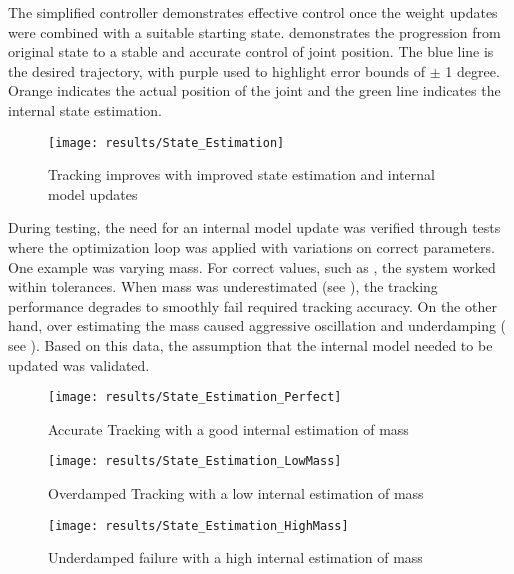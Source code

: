 

The simplified controller demonstrates effective control once the weight updates
were combined with a suitable starting state. 
demonstrates the progression from original state to a stable and accurate
control of joint position. The blue line is the desired trajectory, with purple
used to highlight error bounds of $\pm$ 1 degree. Orange indicates the actual
position of the joint and the green line indicates the internal state
estimation.

\begin{figure}
\centering
\texttt{[image: results/State\_Estimation]}
\caption{Tracking improves with improved state estimation and internal model
updates}
\label{fig:SimplifiedTracking}
\end{figure}


During testing, the need for an internal model update was verified through 
tests where the optimization loop was applied with variations on correct 
parameters. One example was varying mass. For correct values, such as 
, the system worked within tolerances. When 
mass was underestimated (see ), the tracking 
performance degrades to smoothly fail required tracking accuracy. On the other 
hand, over estimating the mass caused aggressive oscillation and underdamping (
see ). Based on this data, the assumption 
that the internal model needed to be updated was validated.

\begin{figure}
\centering
\texttt{[image: results/State\_Estimation\_Perfect]}
\caption{Accurate Tracking with a good internal estimation of mass}
\label{fig:StateEstimationPerfect}
\end{figure}

\begin{figure}
\centering
\texttt{[image: results/State\_Estimation\_LowMass]}
\caption{Overdamped Tracking with a low internal estimation of mass}
\label{fig:StateEstimationLowMass}
\end{figure}

\begin{figure}
\centering
\texttt{[image: results/State\_Estimation\_HighMass]}
\caption{Underdamped failure with a high internal estimation of mass}
\label{fig:StateEstimationHighMass}
\end{figure}

